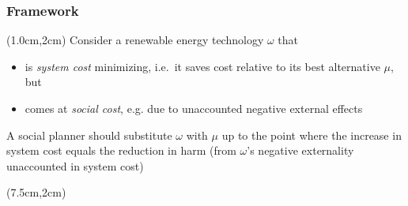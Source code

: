 \documentclass[aspectratio=1610, xcolor=dvipsnames,handout]{beamer} %
\begin{document}
    \begin{frame}
        \frametitle{Framework}

        \begin{textblock*}{5.75cm}
            (1.0cm,2cm)
            Consider a renewable energy technology $\omega$ that
            \begin{itemize}
                \item is \emph{system cost} minimizing, i.e.\ it saves cost relative to its best alternative $\mu$, but
                \item comes at \emph{social cost}, e.g. due to unaccounted negative external effects
            \end{itemize}
            \medskip

            A social planner should substitute $\omega$ with $\mu$ up to the point where the increase in system cost
            equals the reduction in harm (from $\omega$'s negative externality unaccounted in system cost)
        \end{textblock*}

        \begin{textblock*}{7.5cm}
            (7.5cm,2cm)
        \end{textblock*}
    \end{frame}
\end{document}
